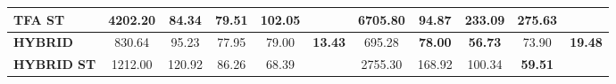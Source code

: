\documentclass[ecp,tc, english]{iiufrgs}
\begin{document}
\begin{table}[!htbp]
{\begin{tabular}{lcccccccccc}
\textbf{TFA ST}                            & 4202.20          & 84.34           & 79.51           & 102.05          &                                 & \textbf{6705.80} & 94.87           & 233.09          & \textbf{275.63} &                                  \\ \hline
\textbf{HYBRID}                            & 830.64           & 95.23           & 77.95           & 79.00           & \multirow{2}{*}{\textbf{13.43}} & 695.28           & \textbf{78.00}  & \textbf{56.73}  & 73.90           & \multirow{2}{*}{\textbf{19.48}}  \\ \cline{1-5} \cline{7-10}
\textbf{HYBRID ST}                         & 1212.00          & 120.92          & 86.26           & 68.39           &                                 & 2755.30          & 168.92          & 100.34          & \textbf{59.51}  &                                  \\ \hline
\end{tabular}%
}
\end{table}
\end{document}

